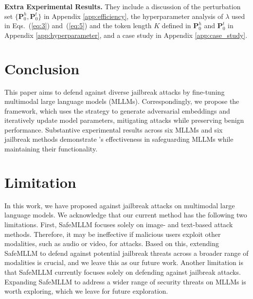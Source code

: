 \textbf{Extra Experimental Results.} They include a discussion of the perturbation set $\{\mathbf{P}_0^h, \mathbf{P}_0^t\}$ in Appendix \textcolor{red}{\ref{app:efficiency}}, the hyperparameter analysis of $\lambda$ used in Eqs.~(\ref{eq:3}) and~(\ref{eq:5}) and the token length $K$ defined in $\mathbf{P}_0^h$ and $\mathbf{P}_0^t$ in Appendix \textcolor{red}{\ref{app:hyperparameter}}, and a case study in Appendix \textcolor{red}{\ref{app:case_study}}.



\section{Conclusion}
This paper aims to defend against diverse jailbreak attacks by fine-tuning multimodal large language models (MLLMs). Correspondingly, we propose the {\name} framework, which uses the {\attack} strategy to generate adversarial embeddings and iteratively update model parameters, mitigating attacks while preserving benign performance. Substantive experimental results across six MLLMs and six jailbreak methods demonstrate {\name}'s effectiveness in safeguarding MLLMs while maintaining their functionality.


\section{Limitation}
In this work, we have proposed {\name} against jailbreak attacks on multimodal large language models. We acknowledge that our current method has the following two limitations. First, SafeMLLM focuses solely on image- and text-based attack methods. Therefore, it may be ineffective if malicious users exploit other modalities, such as audio or video, for attacks. Based on this, extending SafeMLLM to defend against potential jailbreak threats across a broader range of modalities is crucial, and we leave this as our future work. Another limitation is that SafeMLLM currently focuses solely on defending against jailbreak attacks. Expanding SafeMLLM to address a wider range of security threats on MLLMs is worth exploring, which we leave for future exploration.

